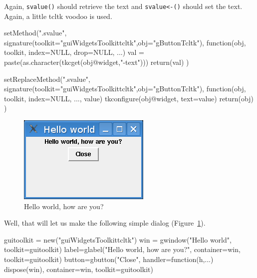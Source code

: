 \documentclass[12pt]{article}
\newcommand{\RFunc}[1]{\texttt{#1()}}
\begin{document}
Again, \RFunc{svalue} should retrieve the text and \RFunc{svalue<-}
should set the text. Again, a little tcltk voodoo is used.

\begin{Scode}
  setMethod(".svalue",
  signature(toolkit="guiWidgetsToolkittcltk",obj="gButtonTcltk"),
  function(obj, toolkit, index=NULL, drop=NULL, ...) {
    val = paste(as.character(tkcget(obj@widget,"-text")))
    return(val)
  })
  
  setReplaceMethod(".svalue",
  signature(toolkit="guiWidgetsToolkittcltk",obj="gButtonTcltk"),
  function(obj, toolkit, index=NULL, ..., value) {
    tkconfigure(obj@widget, text=value)
    return(obj)
  })
\end{Scode}


\begin{figure}[htbp]
  \centering
  \includegraphics[width=.4\textwidth]{helloWorld}
  \caption{Hello world, how are you?}
  \label{fig:hello-world}
\end{figure}




Well, that will let us make the following simple dialog
(Figure~\ref{fig:hello-world}).


\begin{Scode}
  guitoolkit = new("guiWidgetsToolkittcltk")
  win = gwindow("Hello world", toolkit=guitoolkit)
  label=glabel("Hello world, how are you?", container=win, toolkit=guitoolkit)
  button=gbutton("Close", handler=function(h,...) dispose(win),
  container=win, toolkit=guitoolkit)
\end{Scode}
\end{document}
